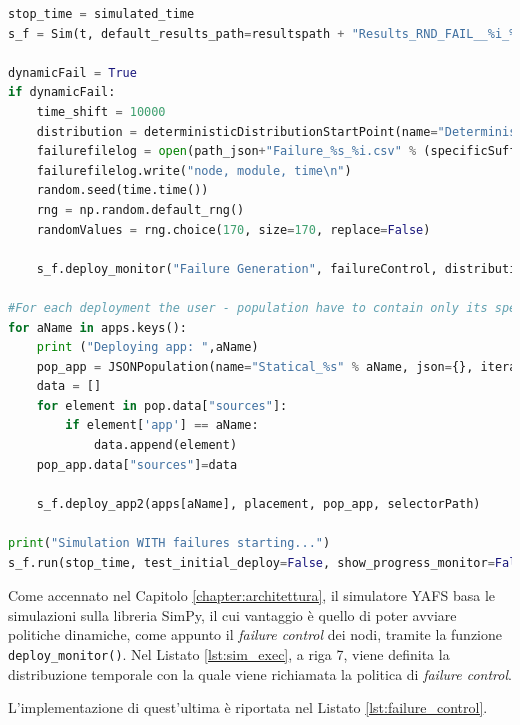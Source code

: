 \begin{lstlisting}[language=python, caption={Creazione della simulazione.}, label={lst:sim_exec}, captionpos=b]
stop_time = simulated_time
s_f = Sim(t, default_results_path=resultspath + "Results_RND_FAIL__%i_%i" % (stop_time,it)) 

dynamicFail = True
if dynamicFail:
    time_shift = 10000
    distribution = deterministicDistributionStartPoint(name="Deterministic", time=time_shift,start=10000)
    failurefilelog = open(path_json+"Failure_%s_%i.csv" % (specificSuffix,stop_time),"w")
    failurefilelog.write("node, module, time\n")
    random.seed(time.time())
    rng = np.random.default_rng()
    randomValues = rng.choice(170, size=170, replace=False)
    
    s_f.deploy_monitor("Failure Generation", failureControl, distribution,sim=s,filelog=failurefilelog,ids=randomValues)

#For each deployment the user - population have to contain only its specific sources
for aName in apps.keys():
    print ("Deploying app: ",aName)
    pop_app = JSONPopulation(name="Statical_%s" % aName, json={}, iteration=it)
    data = []
    for element in pop.data["sources"]:
        if element['app'] == aName:
            data.append(element)
    pop_app.data["sources"]=data

    s_f.deploy_app2(apps[aName], placement, pop_app, selectorPath)

print("Simulation WITH failures starting...")
s_f.run(stop_time, test_initial_deploy=False, show_progress_monitor=False)
\end{lstlisting}

Come accennato nel Capitolo \ref{chapter:architettura}, il simulatore YAFS basa le simulazioni sulla libreria SimPy, il cui vantaggio è quello di poter avviare politiche dinamiche, come appunto il \textit{failure control} dei nodi, tramite la funzione \texttt{deploy\_monitor()}. Nel Listato \ref{lst:sim_exec}, a riga 7, viene definita la distribuzione temporale con la quale viene richiamata la politica di \textit{failure control}. 

L'implementazione di quest'ultima è riportata nel Listato \ref{lst:failure_control}.


